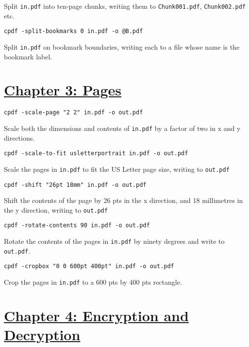 \documentclass{book}
\begin{document}
\noindent Split \texttt{in.pdf} into ten-page chunks, writing them to \texttt{Chunk001.pdf}, \texttt{Chunk002.pdf} etc.

\begin{framed}\noindent\texttt{cpdf -split-bookmarks 0 in.pdf -o @B.pdf}\end{framed}

\noindent Split \texttt{in.pdf} on bookmark boundaries, writing each to a file whose name is the bookmark label.

\section*{\hyperref[chap:3]{Chapter 3: Pages}}

\begin{framed}\noindent\texttt{cpdf -scale-page "2 2" in.pdf -o out.pdf}\end{framed}

\noindent Scale both the dimensions and contents of \texttt{in.pdf} by a factor of two in x and y directions.

\begin{framed}\noindent\texttt{cpdf -scale-to-fit usletterportrait in.pdf -o out.pdf}\end{framed}

\noindent Scale the pages in \texttt{in.pdf} to fit the US Letter page size, writing to \texttt{out.pdf}

\begin{framed}\noindent\texttt{cpdf -shift "26pt 18mm" in.pdf -o out.pdf}\end{framed}

\noindent Shift the contents of the page by 26 pts in the x direction, and 18 millimetres in the y direction, writing to \texttt{out.pdf}

\begin{framed}\noindent\texttt{cpdf -rotate-contents 90 in.pdf -o out.pdf}\end{framed}

\noindent Rotate the contents of the pages in \texttt{in.pdf} by ninety degrees and write to \texttt{out.pdf}.

\begin{framed}\noindent\texttt{cpdf -cropbox "0 0 600pt 400pt" in.pdf -o out.pdf}\end{framed}

\noindent Crop the pages in \texttt{in.pdf} to a 600 pts by 400 pts rectangle.


\section*{\hyperref[chap:4]{Chapter 4: Encryption and Decryption}}
\end{document}
